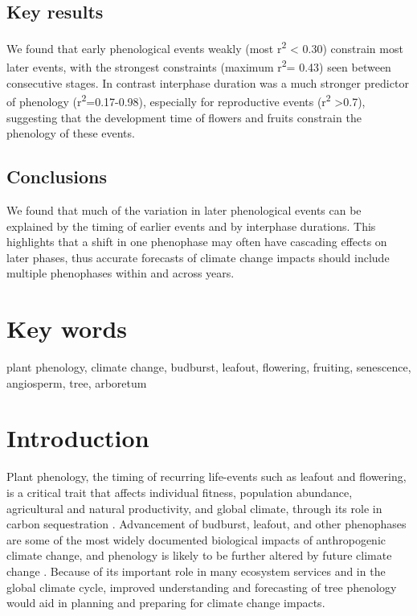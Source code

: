 \documentclass{article}
\begin{document}
\subsection*{Key results}
We found that early phenological events weakly (most r\textsuperscript{2} < 0.30) constrain most later events, with the strongest constraints (maximum r\textsuperscript{2}= 0.43) seen between consecutive stages. In contrast interphase duration was a much stronger predictor of phenology (r\textsuperscript{2}=0.17-0.98), especially for reproductive events (r\textsuperscript{2} >0.7), suggesting that the development time of flowers and fruits constrain the phenology of these events.
\subsection*{Conclusions}
We found that much of the variation in later phenological events can be explained by the timing of earlier events and by interphase durations. This highlights that a shift in one phenophase may often have cascading effects on later phases, thus accurate forecasts of climate change impacts should include multiple phenophases within and across years. 

\section* {Key words}
plant phenology, climate change, budburst, leafout, flowering, fruiting, senescence, angiosperm, tree, arboretum
\section* {Introduction}
Plant phenology, the timing of recurring life-events such as leafout and flowering, is a critical trait that affects individual fitness, population abundance, agricultural and natural productivity, and global climate, through its role in carbon sequestration \citep{chuine2001,cleland2007,willis2010,miller-rushing2010,craine2012}. Advancement of budburst, leafout, and other phenophases are some of the most widely documented biological impacts of anthropogenic climate change, and phenology is likely to be further altered by future climate change \citep{parmesan2006}. Because of its important role in many ecosystem services and in the global climate cycle, improved understanding and forecasting of tree phenology would aid in planning and preparing for climate change impacts.
\end{document}
